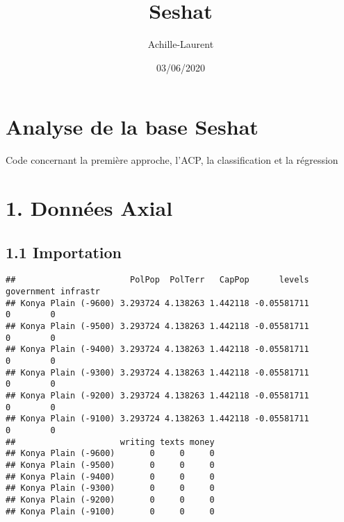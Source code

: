 \documentclass[
]{article}
\title{Seshat}
\author{Achille-Laurent}
\date{03/06/2020}
\newenvironment{Shaded}{\begin{snugshade}}{\end{snugshade}}
\newcommand{\CommentTok}[1]{\textcolor[rgb]{0.56,0.35,0.01}{\textit{#1}}}
\newcommand{\DataTypeTok}[1]{\textcolor[rgb]{0.13,0.29,0.53}{#1}}
\newcommand{\KeywordTok}[1]{\textcolor[rgb]{0.13,0.29,0.53}{\textbf{#1}}}
\newcommand{\NormalTok}[1]{#1}
\newcommand{\OperatorTok}[1]{\textcolor[rgb]{0.81,0.36,0.00}{\textbf{#1}}}
\newcommand{\StringTok}[1]{\textcolor[rgb]{0.31,0.60,0.02}{#1}}
\begin{document}
\maketitle

\hypertarget{analyse-de-la-base-seshat}{%
\section{Analyse de la base Seshat}\label{analyse-de-la-base-seshat}}

Code concernant la première approche, l'ACP, la classification et la
régression

\hypertarget{donnuxe9es-axial}{%
\section{1. Données Axial}\label{donnuxe9es-axial}}

\hypertarget{importation}{%
\subsection{1.1 Importation}\label{importation}}

\begin{Shaded}
\end{Shaded}

\begin{verbatim}
##                       PolPop  PolTerr   CapPop      levels government infrastr
## Konya Plain (-9600) 3.293724 4.138263 1.442118 -0.05581711          0        0
## Konya Plain (-9500) 3.293724 4.138263 1.442118 -0.05581711          0        0
## Konya Plain (-9400) 3.293724 4.138263 1.442118 -0.05581711          0        0
## Konya Plain (-9300) 3.293724 4.138263 1.442118 -0.05581711          0        0
## Konya Plain (-9200) 3.293724 4.138263 1.442118 -0.05581711          0        0
## Konya Plain (-9100) 3.293724 4.138263 1.442118 -0.05581711          0        0
##                     writing texts money
## Konya Plain (-9600)       0     0     0
## Konya Plain (-9500)       0     0     0
## Konya Plain (-9400)       0     0     0
## Konya Plain (-9300)       0     0     0
## Konya Plain (-9200)       0     0     0
## Konya Plain (-9100)       0     0     0
\end{verbatim}
\end{document}
